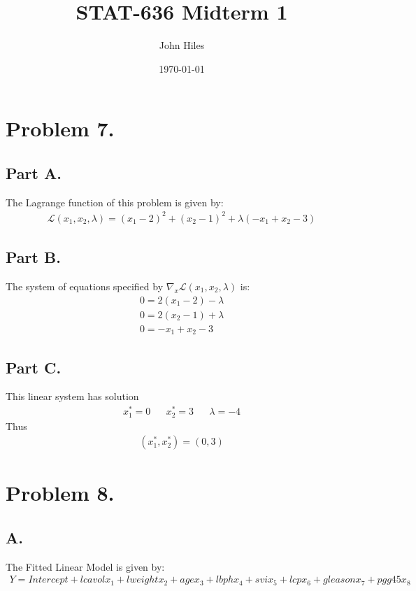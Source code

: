 \documentclass{article}
\title{STAT-636 Midterm 1}
\author{John Hiles}
\date\today
\begin{document}
\maketitle %

\section*{Problem 7.}
\subsection*{Part A.}
The Lagrange function of this problem is given by:
\begin{align*}
\boxed{ \mathcal{L}(x_1,x_2,\lambda) = (x_1-2)^2 + (x_2-1)^2 + \lambda(-x_1 + x_2 -3) }
\end{align*}
\subsection*{Part B.}
The system of equations specified by $\nabla_x \mathcal{L}(x_1,x_2,\lambda)$ is:
\begin{align*}
0 = 2(x_1-2) - \lambda \\
0= 2(x_2-1) + \lambda \\
0= -x_1 +x_2 - 3
\end{align*}
\subsection*{Part C.}
This linear system has solution
\begin{align*}
x_1^* = 0 && x_2^* = 3 && \lambda = -4
\end{align*}
Thus
\begin{align*}
\boxed{ (x_1^*,x_2^*) = (0,3)}
\end{align*}
\clearpage

\section*{Problem 8.}
\subsection*{A.}
The Fitted Linear Model is given by:
\begin{align*}
\boxed{ Y = Intercept + lcavol x_1 + lweight x_2 + age x_3 + lbph x_4 + svi x_5 + lcp x_6 + gleason x_7 + pgg45 x_8 }
\end{align*}
\end{document}
